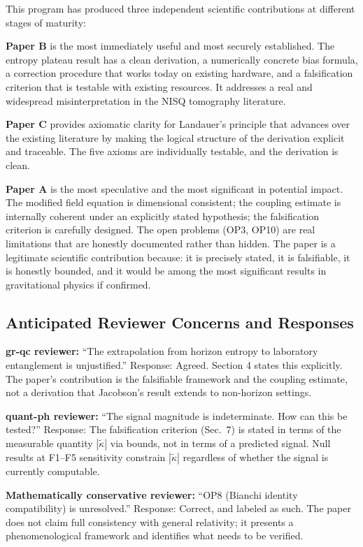 \documentclass[12pt,letterpaper]{article}
\theoremstyle{plain}
\theoremstyle{definition}
\theoremstyle{remark}
\begin{document}
This program has produced three independent scientific contributions at
different stages of maturity:

\textbf{Paper B} is the most immediately useful and most securely
established. The entropy plateau result has a clean derivation,
a numerically concrete bias formula, a correction procedure that
works today on existing hardware, and a falsification criterion
that is testable with existing resources. It addresses a real and
widespread misinterpretation in the NISQ tomography literature.

\textbf{Paper C} provides axiomatic clarity for Landauer's principle
that advances over the existing literature by making the logical structure
of the derivation explicit and traceable. The five axioms are
individually testable, and the derivation is clean.

\textbf{Paper A} is the most speculative and the most significant in
potential impact. The modified field equation is dimensional consistent;
the coupling estimate is internally coherent under an explicitly stated
hypothesis; the falsification criterion is carefully designed. The open
problems (OP3, OP10) are real limitations that are honestly documented
rather than hidden. The paper is a legitimate scientific contribution
because: it is precisely stated, it is falsifiable, it is honestly bounded,
and it would be among the most significant results in gravitational physics
if confirmed.

\subsection{Anticipated Reviewer Concerns and Responses}

\textbf{gr-qc reviewer:} ``The extrapolation from horizon entropy to
laboratory entanglement is unjustified.'' Response: Agreed. Section 4
states this explicitly. The paper's contribution is the falsifiable
framework and the coupling estimate, not a derivation that Jacobson's
result extends to non-horizon settings.

\textbf{quant-ph reviewer:} ``The signal magnitude is indeterminate.
How can this be tested?'' Response: The falsification criterion (Sec.~7)
is stated in terms of the measurable quantity $|\tilde{\kappa}|$ via
bounds, not in terms of a predicted signal. Null results at F1--F5
sensitivity constrain $|\tilde{\kappa}|$ regardless of whether the
signal is currently computable.

\textbf{Mathematically conservative reviewer:} ``OP8 (Bianchi identity
compatibility) is unresolved.'' Response: Correct, and labeled as such.
The paper does not claim full consistency with general relativity; it
presents a phenomenological framework and identifies what needs to be
verified.
\end{document}
